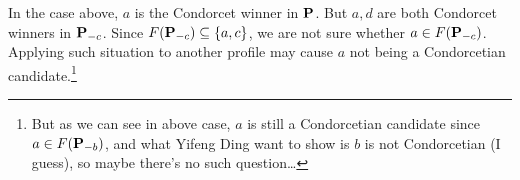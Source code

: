 In the case above, $a$ is the Condorcet winner in $\mathbf{P}$. But $a,d$ are both Condorcet winners in $\mathbf{P}_{-c}$. Since $F(\mathbf{P}_{-c}) \subseteq \{a,c\}$, we are not sure whether $a \in F(\mathbf{P}_{-c})$. Applying such situation to another profile may cause $a$ not being a Condorcetian candidate.\footnote{But as we can see in above case, $a$ is still a Condorcetian candidate since $a \in F(\mathbf{P}_{-b})$, and what Yifeng Ding want to show is $b$ is not Condorcetian (I guess), so maybe there's no such question\dots}